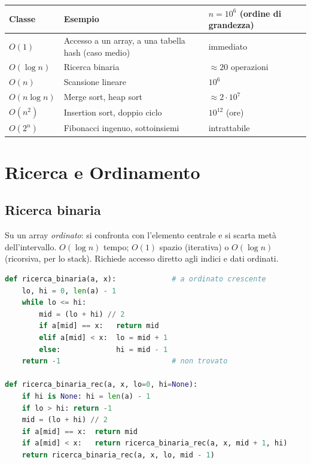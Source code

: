\begin{center}
\small
\begin{tabularx}{\textwidth}{@{}lXl@{}}
\toprule
\textbf{Classe} & \textbf{Esempio} & \textbf{$n = 10^6$ (ordine di grandezza)} \\
\midrule
$O(1)$ & Accesso a un array, a una tabella hash (caso medio) & immediato \\
$O(\log n)$ & Ricerca binaria & $\approx 20$ operazioni \\
$O(n)$ & Scansione lineare & $10^6$ \\
$O(n\log n)$ & Merge sort, heap sort & $\approx 2\cdot 10^7$ \\
$O(n^2)$ & Insertion sort, doppio ciclo & $10^{12}$ (ore) \\
$O(2^n)$ & Fibonacci ingenuo, sottoinsiemi & intrattabile \\
\bottomrule
\end{tabularx}
\end{center}

\section{Ricerca e Ordinamento}

\subsection{Ricerca binaria}
Su un array \emph{ordinato}: si confronta con l'elemento centrale e si scarta metà dell'intervallo. $O(\log n)$ tempo; $O(1)$ spazio (iterativa) o $O(\log n)$ (ricorsiva, per lo stack). Richiede accesso diretto agli indici e dati ordinati.

\begin{lstlisting}[language=Python, caption={Ricerca binaria iterativa e ricorsiva}]
def ricerca_binaria(a, x):             # a ordinato crescente
    lo, hi = 0, len(a) - 1
    while lo <= hi:
        mid = (lo + hi) // 2
        if a[mid] == x:   return mid
        elif a[mid] < x:  lo = mid + 1
        else:             hi = mid - 1
    return -1                          # non trovato

def ricerca_binaria_rec(a, x, lo=0, hi=None):
    if hi is None: hi = len(a) - 1
    if lo > hi: return -1
    mid = (lo + hi) // 2
    if a[mid] == x:  return mid
    if a[mid] < x:   return ricerca_binaria_rec(a, x, mid + 1, hi)
    return ricerca_binaria_rec(a, x, lo, mid - 1)
\end{lstlisting}

